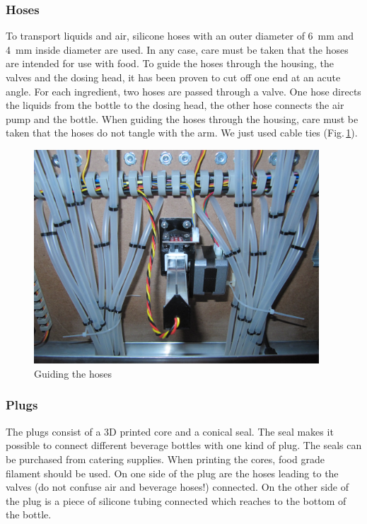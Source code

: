 \documentclass[a4paper]{scrartcl}
\begin{document}
\subsubsection{Hoses}
To transport liquids and air, silicone hoses with an outer diameter of \SI {6}{\milli\metre} and \SI{4}{\milli\metre} inside diameter are used. In any case, care must be taken that the hoses are intended for use with food. To guide the hoses through the housing, the valves and the dosing head, it has been proven to cut off one end at an acute angle.
For each ingredient, two hoses are passed through a valve. One hose directs the liquids from the bottle to the dosing head, the other hose connects the air pump and the bottle. When guiding the hoses through the housing, care must be taken that the hoses do not tangle with the arm. We just used cable ties (Fig.\,\ref{hoses}).

\begin{figure}
  \centering
  \includegraphics[height=8cm]{pics/hoses.JPG}
  \caption{Guiding the hoses} \label{hoses}
\end{figure}

\subsubsection{Plugs}
The plugs consist of a 3D printed core and a conical seal. The seal makes it possible to connect different beverage bottles with one kind of plug. The seals can be purchased from catering supplies. When printing the cores, food grade filament should be used. On one side of the plug are the hoses leading to the valves (do not confuse air and beverage hoses!) connected. On the other side of the plug is a piece of silicone tubing connected which reaches to the bottom of the bottle.
\end{document}
